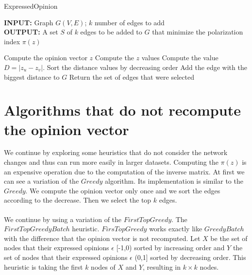 \begin{algorithm}[H]
	\caption{ExpressedΟpinion}
	\label{alg:expressedOpinion}
	
	\begin{flushleft}
        		\textbf{INPUT:} Graph $G(V, E)$; $k$ number of edges to add\\
		\vspace{6pt}
        		\textbf{OUTPUT:} A set $S$ of $k$ edges to be added to $G$ that minimize the polarization
		\\ index $\pi(z)$
	\end{flushleft}
	
	\begin{algorithmic}[1]
			\STATE Compute the opinion vector $z$
			\STATE Compute the $z$ values
				\STATE Compute the value $D=|z_u - z_v|$.
			\ENDFOR
			\STATE Sort the distance values by decreasing order
			\STATE Add the edge with the biggest distance to $G$
		\ENDFOR
		\STATE Return the set of edges that were selected
	\end{algorithmic}
	
\end{algorithm}

\section{Algorithms that do not recompute the opinion vector}
\label{sec:norecomputeAlgo}

We continue by exploring some heuristics that do not consider the network changes and thus can run more easily in larger datasets.
Computing the $\pi(z)$ is an expensive operation due to the computation of the inverse matrix. At first we can see a variation of the $Greedy$ algorithm. Its implementation is similar to the $Greedy$. We compute the opinion vector only once and we sort the edges according to the decrease. Then we select the top $k$ edges.
\\
\\
We continue by using a variation of the $FirstTopGreedy$. The $FirstTopGreedyBatch$ heuristic. $FirsTopGreedy$  works exactly like $GreedyBatch$ with the difference that the opinion vector is not recomputed. Let $X$ be the set of nodes that their expressed opinions $\epsilon$ [-1,0) sorted by increasing order and $Y$ the set of nodes that their expressed opinions $\epsilon$ (0,1] sorted by decreasing order. This heuristic is taking the first $k$ nodes of $X$ and $Y$, resulting in $k \times k$ nodes.
\clearpage


